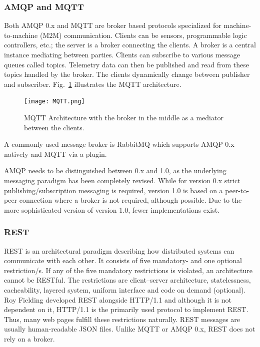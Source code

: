 \subsubsection{AMQP and MQTT}
Both AMQP 0.x and MQTT are broker based protocols specialized for machine-to-machine (M2M) communication. Clients can be sensors, programmable logic controllers, etc.; the server is a broker connecting the clients. A broker is a central instance mediating between parties. Clients can subscribe to various message queues called topics. Telemetry data can then be published and read from these topics handled by the broker. The clients dynamically change between publisher and subscriber. Fig.~\ref{MQTT} illustrates the MQTT architecture.~\cite{Banks2014MQTT2018}

\begin{figure}[ht]
	\centering
  \texttt{[image: MQTT.png]}
	\caption[MQTT Architecture]{MQTT Architecture with the broker in the middle as a mediator between the clients.~\cite{N.A.Pure-javascript-MQTT-broker.2018}}
	\label{MQTT}
\end{figure}

A commonly used message broker is RabbitMQ which supports AMQP 0.x natively and MQTT via a plugin.~\cite{RabittMQ-Documentation2018Which2018}

AMQP needs to be distinguished between 0.x and 1.0, as the underlying messaging paradigm has been completely revised. While for version 0.x strict publishing/subscription messaging is required, version 1.0 is based on a peer-to-peer connection where a broker is not required, although possible. Due to the more sophisticated version of version 1.0, fewer implementations exist.~\cite{Dizdarevic2018SurveyIntegration}


\subsubsection{REST}
REST is an architectural paradigm describing how distributed systems can communicate with each other. It consists of five mandatory- and one optional restriction/s. If any of the five mandatory restrictions is violated, an architecture cannot be RESTful. The restrictions are client–server architecture, statelessness, cacheability, layered system, uniform interface and code on demand (optional). Roy Fielding developed REST alongside HTTP/1.1 and although it is not dependent on it, HTTP/1.1 is the primarily used protocol to implement REST. Thus, many web pages fulfill these restrictions naturally. REST messages are usually human-readable JSON files. Unlike MQTT or AMQP 0.x, REST does not rely on a broker.~\cite{Fielding2000ArchitecturalArchitectures}

